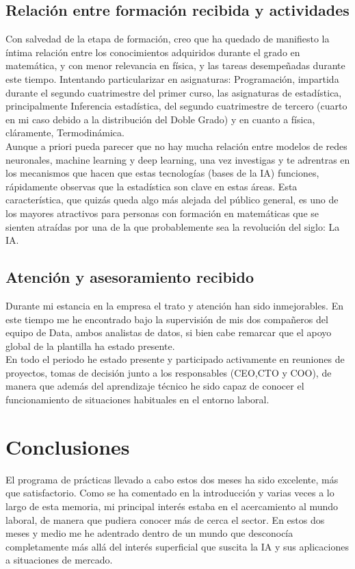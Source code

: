 \section{Relación entre formación recibida y actividades}
\label{Relacion entre formacion recibida y actividades}
%
%
Con salvedad de la etapa de formación, creo que ha quedado de manifiesto la íntima relación entre los conocimientos adquiridos durante el grado en matemática, y con menor relevancia en física, y las tareas desempeñadas durante este tiempo. Intentando particularizar en asignaturas: Programación, impartida durante el segundo cuatrimestre del primer curso, las asignaturas de estadística, principalmente Inferencia estadística, del segundo cuatrimestre de tercero (cuarto en mi caso debido a la distribución del Doble Grado) y en cuanto a física, cláramente, Termodinámica.\\

Aunque a priori pueda parecer que no hay mucha relación entre modelos de redes neuronales, machine learning y deep learning, una vez investigas y te adrentras en los mecanismos que hacen que estas tecnologías (bases de la IA) funciones, rápidamente observas que la estadística son clave en estas áreas. Esta característica, que quizás queda algo más alejada del público general, es uno de los mayores atractivos para personas con formación en matemáticas que se sienten atraídas por una de la que probablemente sea la revolución del siglo: La IA.
%
%
\section{Atención y asesoramiento recibido} \label{Atencion y asesoramiento recibido}
%
%
Durante mi estancia en la empresa el trato y atención han sido inmejorables. En este tiempo me he encontrado bajo la supervisión de mis dos compañeros del equipo de Data, ambos analistas de datos, si bien cabe remarcar que el apoyo global de la plantilla ha estado presente.\\

En todo el periodo he estado presente y participado activamente en reuniones de proyectos, tomas de decisión junto a los responsables (CEO,CTO y COO), de manera que además del aprendizaje técnico he sido capaz de conocer el funcionamiento de situaciones habituales en el entorno laboral.\\
%
%
\chapter{Conclusiones}
%
%
El programa de prácticas llevado a cabo estos dos meses ha sido excelente, más que satisfactorio. Como se ha comentado en la introducción y varias veces a lo largo de esta memoria, mi principal interés estaba en el acercamiento al mundo laboral, de manera que pudiera conocer más de cerca el sector. En estos dos meses y medio me he adentrado dentro de un mundo que desconocía completamente más allá del interés superficial que suscita la IA y sus aplicaciones a situaciones de mercado.\\

